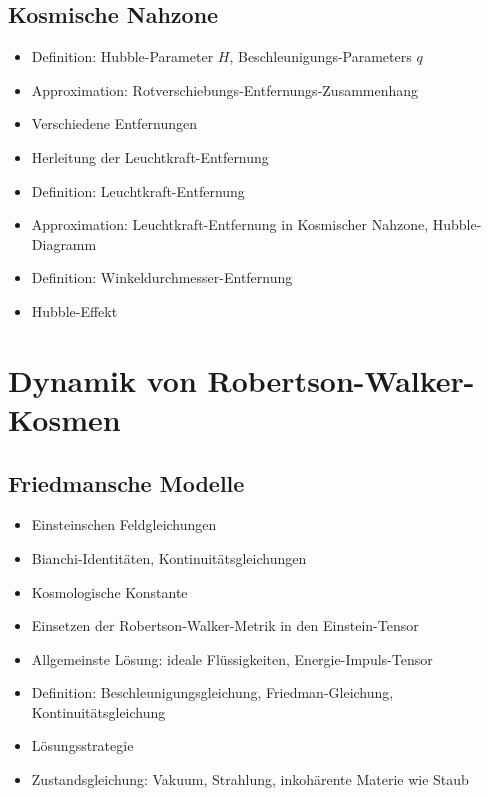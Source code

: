 \documentclass{article}
\begin{document}
\begin{multicols}{2}
    \subsection{Kosmische Nahzone} %
    \label{sub:kosmische_nahzone}
      \begin{itemize}
        \item Definition: Hubble-Parameter $H$, Beschleunigungs-Parameters $q$
        \item Approximation: Rotverschiebungs-Entfernungs-Zusammenhang
        \item Verschiedene Entfernungen
        \item Herleitung der Leuchtkraft-Entfernung
        \item Definition: Leuchtkraft-Entfernung
        \item Approximation: Leuchtkraft-Entfernung in Kosmischer Nahzone, Hubble-Diagramm
        \item Definition: Winkeldurchmesser-Entfernung
        \item Hubble-Effekt
      \end{itemize}

  \section{Dynamik von Robertson-Walker-Kosmen} %
  \label{sec:dynamik_von_robertson_walker_kosmen}
    \subsection{Friedmansche Modelle} %
    \label{sub:friedmansche_modelle}
      \begin{itemize}
        \item Einsteinschen Feldgleichungen
        \item Bianchi-Identitäten, Kontinuitätsgleichungen
        \item Kosmologische Konstante
        \item Einsetzen der Robertson-Walker-Metrik in den Einstein-Tensor
        \item Allgemeinste Lösung: ideale Flüssigkeiten, Energie-Impuls-Tensor
        \item Definition: Beschleunigungsgleichung, Friedman-Gleichung, Kontinuitätsgleichung
        \item Lösungsstrategie
        \item Zustandsgleichung: Vakuum, Strahlung, inkohärente Materie wie Staub
      \end{itemize}


\end{multicols}
\end{document}
